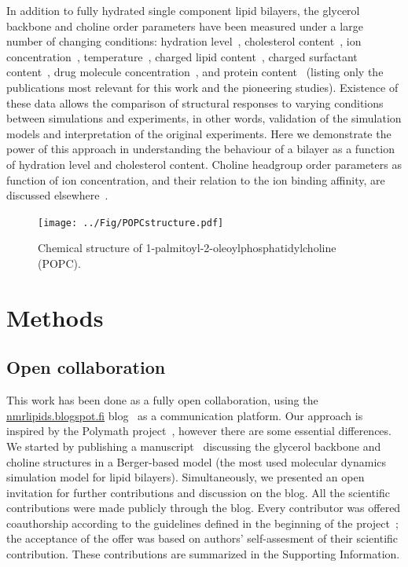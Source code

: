 \documentclass[journal=jacsat,manuscript=article]{achemso}
\begin{document}
In addition to fully hydrated single component lipid bilayers, the glycerol backbone and choline order parameters
have been measured under a large number of changing conditions: hydration level~\cite{bechinger91,ulrich94,dvinskikh05b}, cholesterol content~\cite{brown78,ferreira13},
ion concentration~\cite{brown77,akutsu81,altenbach84,roux90,roux91}, temperature~\cite{gally75}, charged lipid content~\cite{roux90,roux91}, charged surfactant content~\cite{scherer89}, 
drug molecule concentration~\cite{browning82,kelusky84,castro08}, and protein content~\cite{roux89,kuchinka89} (listing only the publications most relevant for this work and the pioneering studies).
Existence of these data allows the comparison of structural responses to varying conditions between simulations and experiments,
in other words, validation of the simulation models and interpretation of the original experiments. 
Here we demonstrate the power of this approach in understanding the behaviour of a bilayer as a function of hydration level and cholesterol content.
Choline headgroup order parameters as function of ion concentration, and their relation to the ion binding affinity, are discussed elsewhere~\cite{ionpaper}.

  \begin{figure}[]
  \centering
  \texttt{[image: ../Fig/POPCstructure.pdf]}

  \caption{\label{POPCstructure}
    Chemical structure of  1-palmitoyl-2-oleoylphosphatidylcholine (POPC).}
  
\end{figure}

\section{Methods}

\subsection{Open collaboration}

This work has been done as a fully open collaboration, using the \url{nmrlipids.blogspot.fi} blog~\cite{nmrlipids}
as a communication platform.
Our approach is inspired by the Polymath project~\cite{gowers09}, however there are some essential differences. 
We started by publishing a manuscript~\cite{ollila13} discussing the glycerol backbone and choline structures 
in a Berger-based model (the most used molecular dynamics simulation model for lipid bilayers).
Simultaneously,  we presented an open invitation for further contributions and discussion on the blog.
All the scientific contributions were made publicly through the blog. Every contributor was offered coauthorship
according to the guidelines defined in the beginning of the project~\cite{creditsPOST};
the acceptance of the offer was based on authors' self-assesment of their scientific contribution.
These contributions are summarized in the Supporting Information. 
\end{document}
